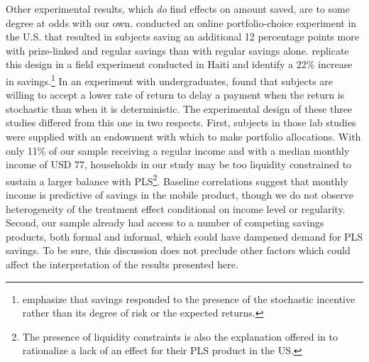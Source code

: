 \documentclass[11pt]{article}
\begin{document}
		Other experimental results, which \emph{do} find effects on amount saved, are to some degree at odds with our own. \textcite{atalay_savings_2014} conducted an online portfolio-choice experiment in the U.S. that resulted in subjects saving an additional 12 percentage points more with prize-linked and regular savings than with regular savings alone. \textcite{dizon_leveraging_2016} replicate this design in a field experiment conducted in Haiti and identify a 22\% increase in savings.\footnote{\textcite{dizon_leveraging_2016} emphasize that savings responded to the presence of the stochastic incentive rather than its degree of risk or the expected returns.} In an experiment with undergraduates, \textcite{filiz-ozbay_lottery_2015} found that subjects are willing to accept a lower rate of return to delay a payment when the return is stochastic than when it is deterministic. The experimental design of these three studies differed from this one in two respects. First, subjects in those lab studies were supplied with an endowment with which to make portfolio allocations. With only 11\% of our sample receiving a regular income and with a median monthly income of USD 77, households in our study may be too liquidity constrained to sustain a larger balance with PLS\footnote{The presence of liquidity constraints is also the explanation offered in \textcite{loibl_testing_2016} to rationalize a lack of an effect for their PLS product in the US.}. Baseline correlations suggest that monthly income is predictive of savings in the mobile product, though we do not observe heterogeneity of the treatment effect conditional on income level or regularity. Second, our sample already had access to a number of competing savings products, both formal and informal, which could have dampened demand for PLS savings. To be sure, this discussion does not preclude other factors which could affect the interpretation of the results presented here.
\end{document}
